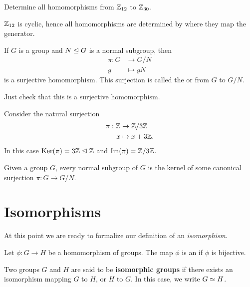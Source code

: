 \documentclass{ximera}
\begin{document}
\begin{exercise}
  Determine all homomorphisms from $\mathbb Z_{12}$ to $\mathbb Z_{30}$.
  \begin{hint}
    $\mathbb Z_{12}$ is cyclic, hence all homomorphisms are determined by
    where they map the generator.
  \end{hint}
\end{exercise}



\begin{theorem}
  If $G$ is a group and $N\trianglelefteq G$ is a normal subgroup, then
  \begin{align*}
  \pi:G &\to G/N\\
  g &\mapsto gN
  \end{align*}
  is a surjective homomorphism. This surjection is called the
   or  from $G$ to
  $G/N$.
  \begin{sketch}
    Just check that this is a surjective homomorphism.
  \end{sketch}
\end{theorem}



\begin{example}
    Consider the natural surjection
  \begin{align*}
    \pi:\mathbb Z &\to \mathbb Z/3\mathbb Z\\
    x &\mapsto x+3\mathbb Z.
  \end{align*}
  In this case $\mathop{\mathrm{Ker}}\nolimits(\pi) = 3\mathbb Z \trianglelefteq \mathbb Z$ and $\operatorname{Im}(\pi) = \mathbb Z/3\mathbb Z$.
\end{example}


\begin{corollary}
  Given a group $G$, every normal subgroup of $G$ is the kernel of
  some canonical surjection $\pi:G\to G/N$.
\end{corollary}




\section{Isomorphisms}

At this point we are ready to formalize our definition of an
\textit{isomorphism}.

\begin{definition}
  Let $\phi:G\to H$ be a homomorphism of groups. The map $\phi$ is an
   if $\phi$ is bijective.


  Two groups $G$ and $H$ are said to be \textbf{isomorphic groups} if
  there exists an isomorphism mapping $G$ to $H$, or $H$ to $G$.  In
  this case, we write $G\simeq H$.
\end{definition}
\end{document}
